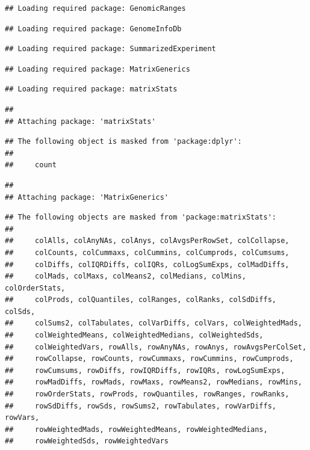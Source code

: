 \documentclass[
]{book}
\begin{document}
\begin{verbatim}
## Loading required package: GenomicRanges
\end{verbatim}

\begin{verbatim}
## Loading required package: GenomeInfoDb
\end{verbatim}

\begin{verbatim}
## Loading required package: SummarizedExperiment
\end{verbatim}

\begin{verbatim}
## Loading required package: MatrixGenerics
\end{verbatim}

\begin{verbatim}
## Loading required package: matrixStats
\end{verbatim}

\begin{verbatim}
## 
## Attaching package: 'matrixStats'
\end{verbatim}

\begin{verbatim}
## The following object is masked from 'package:dplyr':
## 
##     count
\end{verbatim}

\begin{verbatim}
## 
## Attaching package: 'MatrixGenerics'
\end{verbatim}

\begin{verbatim}
## The following objects are masked from 'package:matrixStats':
## 
##     colAlls, colAnyNAs, colAnys, colAvgsPerRowSet, colCollapse,
##     colCounts, colCummaxs, colCummins, colCumprods, colCumsums,
##     colDiffs, colIQRDiffs, colIQRs, colLogSumExps, colMadDiffs,
##     colMads, colMaxs, colMeans2, colMedians, colMins, colOrderStats,
##     colProds, colQuantiles, colRanges, colRanks, colSdDiffs, colSds,
##     colSums2, colTabulates, colVarDiffs, colVars, colWeightedMads,
##     colWeightedMeans, colWeightedMedians, colWeightedSds,
##     colWeightedVars, rowAlls, rowAnyNAs, rowAnys, rowAvgsPerColSet,
##     rowCollapse, rowCounts, rowCummaxs, rowCummins, rowCumprods,
##     rowCumsums, rowDiffs, rowIQRDiffs, rowIQRs, rowLogSumExps,
##     rowMadDiffs, rowMads, rowMaxs, rowMeans2, rowMedians, rowMins,
##     rowOrderStats, rowProds, rowQuantiles, rowRanges, rowRanks,
##     rowSdDiffs, rowSds, rowSums2, rowTabulates, rowVarDiffs, rowVars,
##     rowWeightedMads, rowWeightedMeans, rowWeightedMedians,
##     rowWeightedSds, rowWeightedVars
\end{verbatim}
\end{document}

